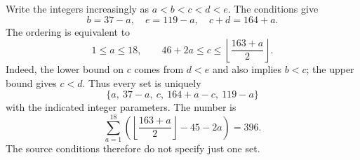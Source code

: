 Write the integers increasingly as $a<b<c<d<e$. The conditions give
\[
b=37-a,\quad e=119-a,\quad c+d=164+a.
\]
The ordering is equivalent to
\[
1\le a\le18,\qquad 46+2a\le c\le\left\lfloor\dfrac{163+a}{2}\right\rfloor.
\]
Indeed, the lower bound on $c$ comes from $d<e$ and also implies $b<c$; the upper bound gives $c<d$. Thus every set is uniquely
\[
\boxed{\{a,\ 37-a,\ c,\ 164+a-c,\ 119-a\}}
\]
with the indicated integer parameters. The number is
\[
\sum_{a=1}^{18}\left(\left\lfloor\dfrac{163+a}{2}\right\rfloor-45-2a\right)=\boxed{396}.
\]
The source conditions therefore do not specify just one set.
